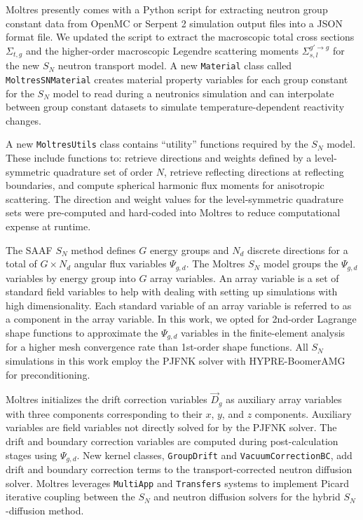 Moltres presently comes with a Python script for extracting neutron group
constant data from OpenMC \cite{boyd_multigroup_2019} or Serpent 2 \cite{leppanen_serpent_2014}
simulation output files into a JSON format file. We updated the script to extract
the macroscopic total cross sections $\Sigma_{t,g}$ and the higher-order macroscopic Legendre
scattering moments $\Sigma^{g'\rightarrow g}_{s,l}$ for the new $S_N$ neutron transport model. A
new \texttt{Material} class called \texttt{MoltresSNMaterial} creates material
property variables for each group constant for the $S_N$ model to read during a neutronics
simulation and can interpolate between group constant datasets to simulate temperature-dependent
reactivity changes.

A new \texttt{MoltresUtils} class contains ``utility'' functions required by the $S_N$ model.
These include functions to: retrieve directions and weights defined by a
level-symmetric quadrature set of order $N$, retrieve reflecting directions at
reflecting boundaries, and compute spherical harmonic flux moments for anisotropic
scattering. The direction and weight values for the level-symmetric quadrature sets were
pre-computed and hard-coded into Moltres to reduce computational expense at runtime.

The \gls{SAAF} $S_N$ method defines $G$ energy groups and $N_d$ discrete directions for a total
of $G\times N_d$ angular flux variables $\Psi_{g,d}$. The Moltres $S_N$ model groups the
$\Psi_{g,d}$ variables by energy group into $G$ array variables. An array variable is a
set of standard field variables to help with dealing with setting up simulations with high
dimensionality. Each standard variable of an array variable is referred to as a component in the
array variable. In this work, we opted for
2nd-order Lagrange shape functions to approximate the $\Psi_{g,d}$ variables in the finite-element
analysis for a higher mesh convergence rate than 1st-order shape functions.
All $S_N$ simulations in this work employ the \gls{PJFNK} solver \cite{knoll_jacobian-free_2004}
with HYPRE-BoomerAMG \cite{hypre_hypre_2022} for preconditioning.

Moltres initializes the drift correction variables $\vec{D}_g$ as auxiliary array variables
with three components corresponding to their $x$, $y$, and $z$ components. Auxiliary variables
are field variables not directly solved for by the \gls{PJFNK} solver.
The drift and boundary correction variables are computed during
post-calculation stages using $\Psi_{g,d}$.
New kernel classes, \texttt{GroupDrift} and \texttt{VacuumCorrectionBC}, add
drift and boundary correction terms to the transport-corrected neutron diffusion solver.
Moltres leverages \texttt{MultiApp} and \texttt{Transfers} systems
\cite{gaston_physics-based_2015} to implement Picard iterative coupling between the $S_N$ and
neutron diffusion solvers for the hybrid $S_N$-diffusion method.
